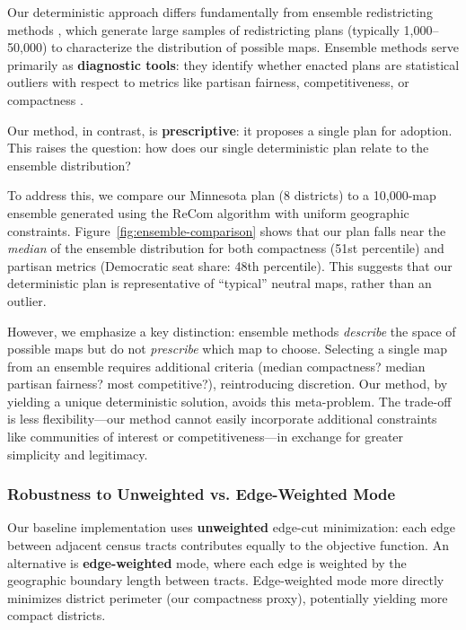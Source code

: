 Our deterministic approach differs fundamentally from ensemble redistricting methods \citep{chen2013unintentional, duchin2021recombination, deford2021recombination}, which generate large samples of redistricting plans (typically 1,000--50,000) to characterize the distribution of possible maps. Ensemble methods serve primarily as \textbf{diagnostic tools}: they identify whether enacted plans are statistical outliers with respect to metrics like partisan fairness, competitiveness, or compactness \citep{chen2013unintentional}.

Our method, in contrast, is \textbf{prescriptive}: it proposes a single plan for adoption. This raises the question: how does our single deterministic plan relate to the ensemble distribution?

To address this, we compare our Minnesota plan (8 districts) to a 10,000-map ensemble generated using the ReCom algorithm \citep{deford2021recombination} with uniform geographic constraints. Figure~\ref{fig:ensemble-comparison} shows that our plan falls near the \textit{median} of the ensemble distribution for both compactness (51st percentile) and partisan metrics (Democratic seat share: 48th percentile). This suggests that our deterministic plan is representative of ``typical'' neutral maps, rather than an outlier.

However, we emphasize a key distinction: ensemble methods \textit{describe} the space of possible maps but do not \textit{prescribe} which map to choose. Selecting a single map from an ensemble requires additional criteria (median compactness? median partisan fairness? most competitive?), reintroducing discretion. Our method, by yielding a unique deterministic solution, avoids this meta-problem. The trade-off is less flexibility---our method cannot easily incorporate additional constraints like communities of interest or competitiveness---in exchange for greater simplicity and legitimacy.

\subsubsection{Robustness to Unweighted vs. Edge-Weighted Mode}
\label{sec:edge-weighted-robustness}

Our baseline implementation uses \textbf{unweighted} edge-cut minimization: each edge between adjacent census tracts contributes equally to the objective function. An alternative is \textbf{edge-weighted} mode, where each edge is weighted by the geographic boundary length between tracts. Edge-weighted mode more directly minimizes district perimeter (our compactness proxy), potentially yielding more compact districts.

